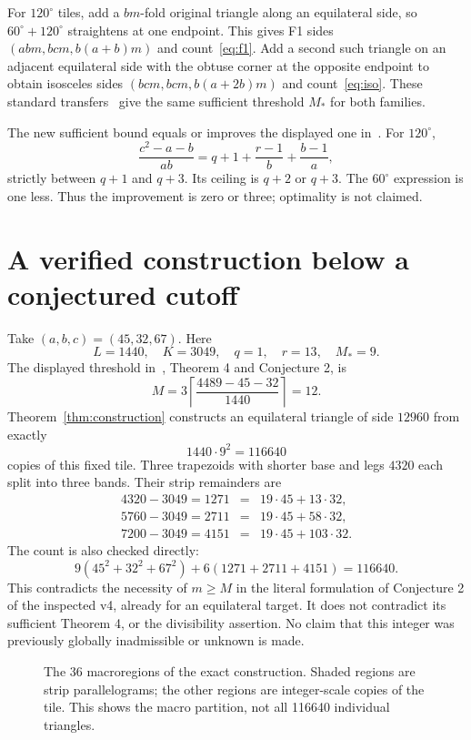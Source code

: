 \documentclass[11pt]{article}
\begin{document}
For $120^\circ$ tiles, add a $bm$-fold original triangle along an equilateral side, so $60^\circ+120^\circ$ straightens at one endpoint. This gives F1 sides $(abm,bcm,b(a+b)m)$ and count~\eqref{eq:f1}. Add a second such triangle on an adjacent equilateral side with the obtuse corner at the opposite endpoint to obtain isosceles sides $(bcm,bcm,b(a+2b)m)$ and count~\eqref{eq:iso}. These standard transfers~\cite{Zhang} give the same sufficient threshold $M_*$ for both families.

The new sufficient bound equals or improves the displayed one in~\cite{Zhang}. For $120^\circ$,
\[
\frac{c^2-a-b}{ab}=q+1+\frac{r-1}{b}+\frac{b-1}{a},
\]
strictly between $q+1$ and $q+3$. Its ceiling is $q+2$ or $q+3$. The $60^\circ$ expression is one less. Thus the improvement is zero or three; optimality is not claimed.

\section{A verified construction below a conjectured cutoff}
Take $(a,b,c)=(45,32,67)$. Here
\[
L=1440,\quad K=3049,\quad q=1,\quad r=13,\quad M_*=9.
\]
The displayed threshold in~\cite{Zhang}, Theorem 4 and Conjecture 2, is
\[
 M=3\left\lceil\frac{4489-45-32}{1440}\right\rceil=12.
\]
Theorem~\ref{thm:construction} constructs an equilateral triangle of side $12960$ from exactly
\[
\boxed{1440\cdot9^2=116640}
\]
copies of this fixed tile. Three trapezoids with shorter base and legs $4320$ each split into three bands. Their strip remainders are
\[
\begin{array}{rcl}
4320-3049=1271&=&19\cdot45+13\cdot32,\\
5760-3049=2711&=&19\cdot45+58\cdot32,\\
7200-3049=4151&=&19\cdot45+103\cdot32.
\end{array}
\]
The count is also checked directly:
\[
9(45^2+32^2+67^2)+6(1271+2711+4151)=116640.
\]
This contradicts the necessity of $m\ge M$ in the literal formulation of Conjecture 2 of the inspected v4, already for an equilateral target. It does not contradict its sufficient Theorem 4, or the divisibility assertion. No claim that this integer was previously globally inadmissible or unknown is made.

\begin{figure}[ht]
\centering
\caption{The 36 macroregions of the exact construction. Shaded regions are strip parallelograms; the other regions are integer-scale copies of the tile. This shows the macro partition, not all 116640 individual triangles.}
\end{figure}
\end{document}
